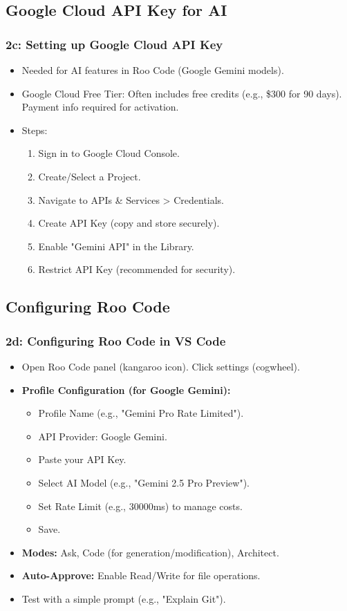 \documentclass{beamer}
\begin{document}
\subsection{Google Cloud API Key for AI}
\begin{frame}
  \frametitle{2c: Setting up Google Cloud API Key}
  \begin{itemize}
    \item Needed for AI features in Roo Code (Google Gemini models).
    \item Google Cloud Free Tier: Often includes free credits (e.g., \$300 for 90 days). Payment info required for activation.
    \item Steps:
    \begin{enumerate}
        \item Sign in to Google Cloud Console.
        \item Create/Select a Project.
        \item Navigate to APIs \& Services > Credentials.
        \item Create API Key (copy and store securely).
        \item Enable "Gemini API" in the Library.
        \item Restrict API Key (recommended for security).
    \end{enumerate}
  \end{itemize}
\end{frame}

\subsection{Configuring Roo Code}
\begin{frame}
  \frametitle{2d: Configuring Roo Code in VS Code}
  \begin{itemize}
    \item Open Roo Code panel (kangaroo icon). Click settings (cogwheel).
    \item \textbf{Profile Configuration (for Google Gemini):}
    \begin{itemize}
        \item Profile Name (e.g., "Gemini Pro Rate Limited").
        \item API Provider: Google Gemini.
        \item Paste your API Key.
        \item Select AI Model (e.g., "Gemini 2.5 Pro Preview").
        \item Set Rate Limit (e.g., 30000ms) to manage costs.
        \item Save.
    \end{itemize}
    \item \textbf{Modes:} Ask, Code (for generation/modification), Architect.
    \item \textbf{Auto-Approve:} Enable Read/Write for file operations.
    \item Test with a simple prompt (e.g., "Explain Git").
  \end{itemize}
\end{frame}
\end{document}
